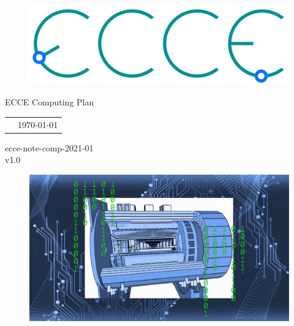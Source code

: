 \renewcommand*\familydefault{\sfdefault}
{\sffamily
\vfill
\vspace{4cm}
\begin{figure}[H]
  \begin{center}
  \includegraphics[width=0.3\linewidth]{figs/ecce-logo.png}
\end{center}
\end{figure}

\begin{center}
  \large
  {\LARGE{ECCE Computing Plan}}

  \begin{tabular}{cc}

& \today%
  \end{tabular}
  \end{center}

\vspace{15cm}
\hspace*{0pt}\hfill ecce-note-comp-2021-01 \\
\hspace*{0pt}\hfill v1.0
\vspace{-15cm}

\vspace{1cm}

\begin{figure}[H]
  \begin{center}
    \includegraphics[width=0.9\linewidth]{figs/ECCE_Computing_Fig2.pdf}
  \end{center}
\end{figure}
}


\vfill
\renewcommand*\familydefault{\rmdefault}
